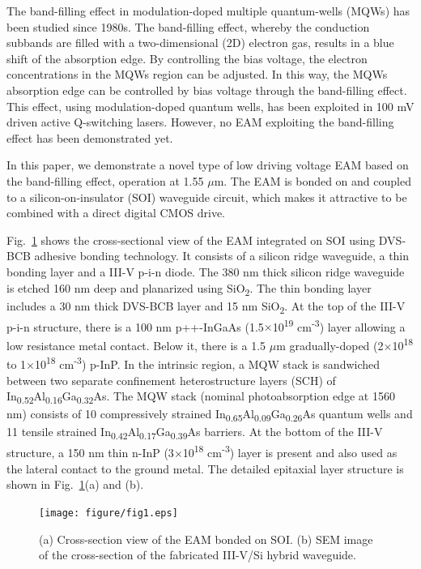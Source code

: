 \documentclass[aip,apl,preprint,a4paper]{revtex4-1}
\def\SP#1{\textsuperscript{#1}}
\def\SB#1{\textsubscript{#1}}
\begin{document}
The band-filling effect in modulation-doped multiple quantum-wells (MQWs) has been studied since 1980s.\cite{livescu1988free} The band-filling effect, whereby the conduction subbands are filled with a two-dimensional (2D) electron gas, results in a blue shift of the absorption edge. By controlling the bias voltage, the electron concentrations in the MQWs region can be adjusted. In this way, the MQWs absorption edge can be controlled by bias voltage through the band-filling effect. This effect, using modulation-doped quantum wells, has been exploited in 100 mV driven active Q-switching lasers.\cite{kalinovsky1993free} However, no EAM exploiting the band-filling effect has been demonstrated yet.


In this paper, we demonstrate a novel type of low driving voltage EAM based on the band-filling effect, operation at 1.55 $\mu$m. The EAM is bonded on and coupled to a silicon-on-insulator (SOI) waveguide circuit, which makes it attractive to be combined with a direct digital CMOS drive.


Fig.~\ref{fig:1} shows the cross-sectional view of the EAM integrated on SOI using DVS-BCB adhesive bonding technology.\cite{roelkensiii-v-on-silicon2015} It consists of a silicon ridge waveguide, a thin bonding layer and a III-V p-i-n diode. The 380 nm thick silicon ridge waveguide is etched 160 nm deep and planarized using SiO\SB{2}. The thin bonding layer includes a 30 nm thick DVS-BCB layer and 15 nm SiO\SB{2}. At the top of the III-V p-i-n structure, there is a 100 nm p++-InGaAs (1.5$\times$10\SP{19} cm\SP{-3}) layer allowing a low resistance metal contact. Below it, there is a 1.5 $\mu$m gradually-doped (2$\times$10\SP{18} to 1$\times$10\SP{18} cm\SP{-3}) p-InP. In the intrinsic region, a MQW stack is sandwiched between two separate confinement heterostructure layers (SCH) of In\SB{0.52}Al\SB{0.16}Ga\SB{0.32}As. The MQW stack (nominal photoabsorption edge at 1560 nm) consists of 10 compressively strained In\SB{0.65}Al\SB{0.09}Ga\SB{0.26}As quantum wells and 11 tensile strained In\SB{0.42}Al\SB{0.17}Ga\SB{0.39}As barriers. At the bottom of the III-V structure, a 150 nm thin n-InP (3$\times$10\SP{18} cm\SP{-3}) layer is present and also used as the lateral contact to the ground metal.  The detailed epitaxial layer structure is shown in Fig.~\ref{fig:1}(a) and (b).

\begin{figure}
	\texttt{[image: figure/fig1.eps]}%
	\caption{\label{fig:1} (a) Cross-section view of the EAM bonded on SOI. (b) SEM image of the cross-section of the fabricated III-V/Si hybrid waveguide.}
\end{figure}
\end{document}

